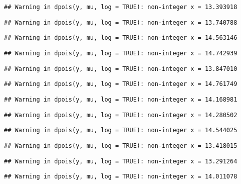 \documentclass[
]{article}
\begin{document}
\begin{verbatim}
## Warning in dpois(y, mu, log = TRUE): non-integer x = 13.393918
\end{verbatim}

\begin{verbatim}
## Warning in dpois(y, mu, log = TRUE): non-integer x = 13.740788
\end{verbatim}

\begin{verbatim}
## Warning in dpois(y, mu, log = TRUE): non-integer x = 14.563146
\end{verbatim}

\begin{verbatim}
## Warning in dpois(y, mu, log = TRUE): non-integer x = 14.742939
\end{verbatim}

\begin{verbatim}
## Warning in dpois(y, mu, log = TRUE): non-integer x = 13.847010
\end{verbatim}

\begin{verbatim}
## Warning in dpois(y, mu, log = TRUE): non-integer x = 14.761749
\end{verbatim}

\begin{verbatim}
## Warning in dpois(y, mu, log = TRUE): non-integer x = 14.168981
\end{verbatim}

\begin{verbatim}
## Warning in dpois(y, mu, log = TRUE): non-integer x = 14.280502
\end{verbatim}

\begin{verbatim}
## Warning in dpois(y, mu, log = TRUE): non-integer x = 14.544025
\end{verbatim}

\begin{verbatim}
## Warning in dpois(y, mu, log = TRUE): non-integer x = 13.418015
\end{verbatim}

\begin{verbatim}
## Warning in dpois(y, mu, log = TRUE): non-integer x = 13.291264
\end{verbatim}

\begin{verbatim}
## Warning in dpois(y, mu, log = TRUE): non-integer x = 14.011078
\end{verbatim}
\end{document}
